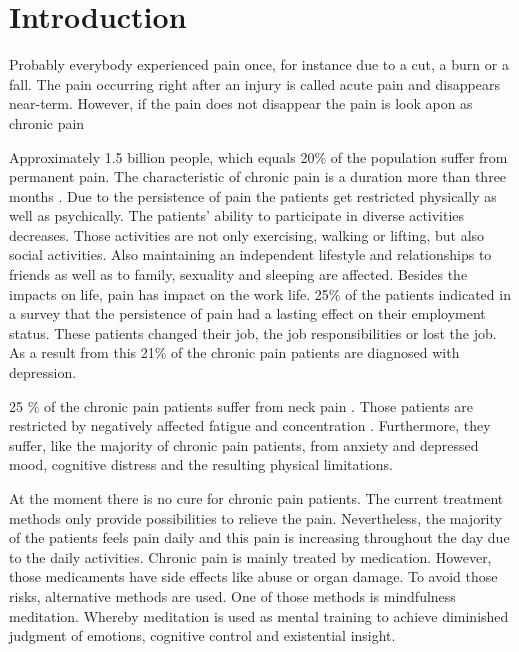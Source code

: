 \chapter{Introduction}

Probably everybody experienced pain once, for instance due to a cut, a burn or a fall. The pain occurring right after an injury is called acute pain and disappears near-term. However, if the pain does not disappear the pain is look apon as chronic pain \cite{Briggs2010,Mello2016}

Approximately 1.5 billion people, which equals 20\% of the population suffer from permanent pain\cite{Zeidan2016,Macfarlanea2016}. The characteristic of chronic pain is a duration more than three months \cite{Mello2016}. Due to the persistence of pain the patients get restricted physically as well as psychically. 
The patients' ability to participate in diverse activities decreases. Those activities are not only exercising, walking or lifting, but also social activities. Also maintaining an independent lifestyle and relationships to friends as well as to family, sexuality and sleeping are affected. Besides the impacts on life, pain has impact on the work life. 25\% of the patients indicated in a survey that the persistence of pain had a lasting effect on their employment status. These patients changed their job, the job responsibilities or lost the job. 
As a result from this 21\% of the chronic pain patients are diagnosed with depression. \cite{Breivik2006}

25 \% of the chronic pain patients suffer from neck pain \cite{Macfarlanea2016}. Those patients are restricted by negatively affected fatigue and concentration \cite{vanRanderaat2016}. Furthermore, they suffer, like the majority of chronic pain patients, from anxiety and depressed mood, cognitive distress and the resulting physical limitations. \cite{gross2013}

At the moment there is no cure for chronic pain patients. The current treatment methods only provide possibilities to relieve the pain. \cite{marcus2009,pope2017} Nevertheless, the majority of the patients feels pain daily and this pain is increasing throughout the day due to the daily activities. \cite{Breivik2006}
Chronic pain is mainly treated by medication. However, those medicaments have side effects like abuse or organ damage. To avoid those risks, alternative methods are used. One of those methods is mindfulness meditation. Whereby meditation is used as mental training to achieve diminished judgment of emotions, cognitive control and existential insight. \cite{Zeidan2012}

